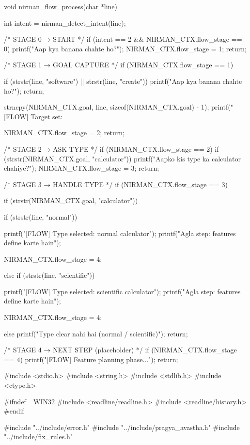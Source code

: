 \documentclass{article}
\begin{document}
void nirman_flow_process(char *line)
{
    int intent = nirman_detect_intent(line);

    /* STAGE 0 → START */
    if (intent == 2 && NIRMAN_CTX.flow_stage == 0)
    {
        printf("Aap kya banana chahte ho?\n");
        NIRMAN_CTX.flow_stage = 1;
        return;
    }

    /* STAGE 1 → GOAL CAPTURE */
    if (NIRMAN_CTX.flow_stage == 1)
    {
        if (strstr(line, "software") || strstr(line, "create"))
        {
            printf("Aap kya banana chahte ho?\n");
            return;
        }

        strncpy(NIRMAN_CTX.goal, line, sizeof(NIRMAN_CTX.goal) - 1);
        printf("[FLOW] Target set: %

        NIRMAN_CTX.flow_stage = 2;
        return;
    }

    /* STAGE 2 → ASK TYPE */
    if (NIRMAN_CTX.flow_stage == 2)
    {
        if (strstr(NIRMAN_CTX.goal, "calculator"))
        {
            printf("Aapko kis type ka calculator chahiye?\n");
            NIRMAN_CTX.flow_stage = 3;
            return;
        }
    }

    /* STAGE 3 → HANDLE TYPE */
    if (NIRMAN_CTX.flow_stage == 3)
    {
        if (strstr(NIRMAN_CTX.goal, "calculator"))
        {
            if (strstr(line, "normal"))
            {
                printf("[FLOW] Type selected: normal calculator\n");
                printf("Agla step: features define karte hain\n");

                NIRMAN_CTX.flow_stage = 4;
            }
            else if (strstr(line, "scientific"))
            {
                printf("[FLOW] Type selected: scientific calculator\n");
                printf("Agla step: features define karte hain\n");

                NIRMAN_CTX.flow_stage = 4;
            }
            else
            {
                printf("Type clear nahi hai (normal / scientific)\n");
            }
            return;
        }
    }

    /* STAGE 4 → NEXT STEP (placeholder) */
    if (NIRMAN_CTX.flow_stage == 4)
    {
        printf("[FLOW] Feature planning phase...\n");
        return;
    }
}
#include <stdio.h>
#include <string.h>
#include <stdlib.h>
#include <ctype.h>

#ifndef _WIN32
#include <readline/readline.h>
#include <readline/history.h>
#endif

#include "../include/error.h"
#include "../include/pragya_avastha.h"
#include "../include/fix_rules.h"
\end{document}
